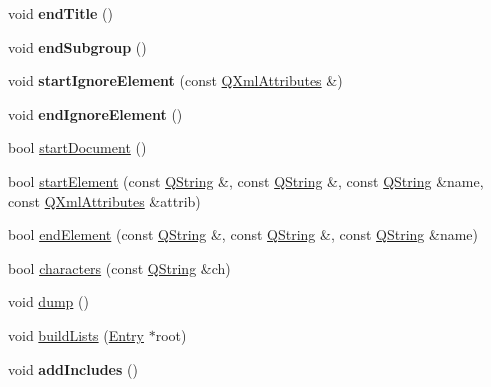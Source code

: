 \begin{DoxyCompactItemize}
\item 
\mbox{\label{class_tag_file_parser_a3210a7d1250f47f40e9e7e2e55fcbaf6}} 
void {\bfseries end\+Title} ()
\item 
\mbox{\label{class_tag_file_parser_a63cb54e8b8b03819af5ff4464f134509}} 
void {\bfseries end\+Subgroup} ()
\item 
\mbox{\label{class_tag_file_parser_acb04850b5bd3986ae23351a81ee8c947}} 
void {\bfseries start\+Ignore\+Element} (const \mbox{\hyperlink{class_q_xml_attributes}{Q\+Xml\+Attributes}} \&)
\item 
\mbox{\label{class_tag_file_parser_af0f86acf5070e1450ebd7afe2f0756df}} 
void {\bfseries end\+Ignore\+Element} ()
\item 
bool \mbox{\hyperlink{class_tag_file_parser_a56d1a932efadb2ddd7e459884ebab4e4}{start\+Document}} ()
\item 
bool \mbox{\hyperlink{class_tag_file_parser_ad9f6b4e83d37df58b95a2018d4e2e606}{start\+Element}} (const \mbox{\hyperlink{class_q_string}{Q\+String}} \&, const \mbox{\hyperlink{class_q_string}{Q\+String}} \&, const \mbox{\hyperlink{class_q_string}{Q\+String}} \&name, const \mbox{\hyperlink{class_q_xml_attributes}{Q\+Xml\+Attributes}} \&attrib)
\item 
bool \mbox{\hyperlink{class_tag_file_parser_aeb0fd2877b6d5fc40a15f7c7bec19ee0}{end\+Element}} (const \mbox{\hyperlink{class_q_string}{Q\+String}} \&, const \mbox{\hyperlink{class_q_string}{Q\+String}} \&, const \mbox{\hyperlink{class_q_string}{Q\+String}} \&name)
\item 
bool \mbox{\hyperlink{class_tag_file_parser_a3d80deca329fd56350927d24c84a21b1}{characters}} (const \mbox{\hyperlink{class_q_string}{Q\+String}} \&ch)
\item 
void \mbox{\hyperlink{class_tag_file_parser_adce233a37587ff0cc0753ae672f67d25}{dump}} ()
\item 
void \mbox{\hyperlink{class_tag_file_parser_a92748cf53ec12acd05e1003b1fcd34e1}{build\+Lists}} (\mbox{\hyperlink{class_entry}{Entry}} $\ast$root)
\item 
\mbox{\label{class_tag_file_parser_ab88c5f05236839ab0744c9e08d1c77e4}} 
void {\bfseries add\+Includes} ()
\end{DoxyCompactItemize}


